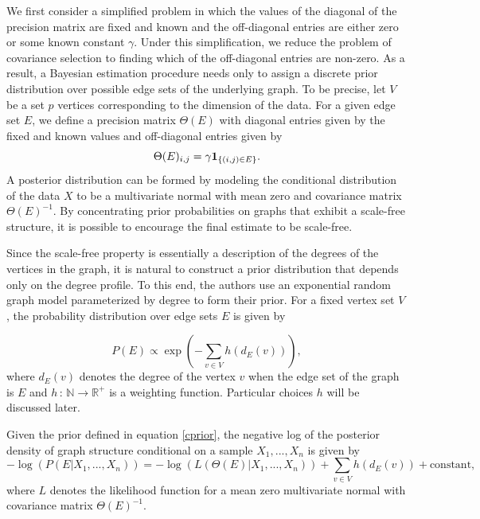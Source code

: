 \documentclass{uwstat572}
\theoremstyle{remark}
\theoremstyle{definition}
\begin{document}
We first consider a simplified problem in which the values of the diagonal of the precision matrix are fixed and known and the off-diagonal entries are either zero or some known constant $\gamma$.  Under this simplification, we reduce the problem of covariance selection to finding which of the off-diagonal entries are non-zero.  As a result, a Bayesian estimation procedure needs only to assign a discrete prior distribution over possible edge sets of the underlying graph. To be precise, let $V$ be a set $p$ vertices corresponding to the dimension of the data.  For a given edge set $E$, we define a precision matrix $\Theta(E)$ with diagonal entries given by the fixed and known values and off-diagonal entries given by
\begin{equation*}
    \Theta(E)_{i,j} = \gamma {\bf{1}}_{\{(i,j) \in E\}}.
\end{equation*}
A posterior distribution can be formed by modeling the conditional distribution of the data $X$ to be a multivariate normal with mean zero and covariance matrix $\Theta(E)^{-1}$.  By concentrating prior probabilities on graphs that exhibit a scale-free structure, it is possible to encourage the final estimate to be scale-free.

Since the scale-free property is essentially a description of the degrees of the vertices in the graph, it is natural to construct a prior distribution that depends only on the degree profile.  To this end, the authors use an exponential random graph model parameterized by degree to form their prior.  For a fixed vertex set $V$, the probability distribution over edge sets $E$ is given by

\begin{equation}\label{cprior}
P( E ) \propto \exp \left( - \sum_{v \in V} h(d_E(v)) \right),
\end{equation}
where $d_E(v)$ denotes the degree of the vertex $v$ when the edge set of the graph is $E$ and $h \, : \, \mathbb{N} \to \mathbb{R}^+$ is a weighting function.  Particular choices $h$ will be discussed later.

Given the prior defined in equation \eqref{cprior}, the negative log of the posterior density of graph structure conditional on a sample $X_1,...,X_n$ is given by
\begin{equation}\label{logpost}
    -\log( P( E | X_1,...,X_n)) = - \log(L(\Theta(E) | X_1,...,X_n) ) + \sum_{v \in V} h( d_E(v)) + \text{constant},
\end{equation}
where $L$ denotes the likelihood function for a mean zero multivariate normal with covariance matrix $\Theta(E)^{-1}$. 
\end{document}
